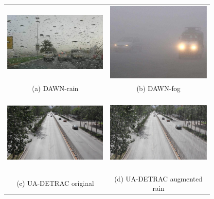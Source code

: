 \documentclass[]{article}
\begin{document}
	\begin{figure}[H]
		\captionsetup{font=scriptsize}
		\small
		\centering
		\begin{tabular}{cc}
			\includegraphics[width=65mm, height=40mm]{dawn-train-fullres.png} &   \includegraphics[width=65mm, height=40mm]{dawn-fog.jpg} \\
			(a) DAWN-rain & (b) DAWN-fog  \\[6pt]
			\includegraphics[width=65mm, height=40mm]{detrac-orig.jpg} &   \includegraphics[width=65mm, height=40mm]{detrac-rain-fullres.png} \\
			(c) UA-DETRAC original  & (d) UA-DETRAC augmented rain \\[6pt]

\end{tabular}
\end{figure}
\end{document}
